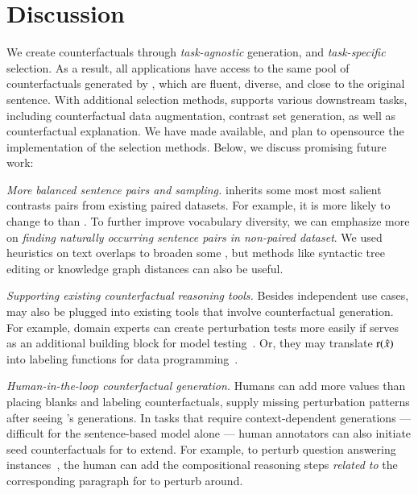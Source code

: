 \section{Discussion}
\label{sec:discuss}

We create counterfactuals through \emph{task-agnostic} generation, and \emph{task-specific} selection.
As a result, all applications have access to the same pool of counterfactuals generated by \sysname, which are fluent, diverse, and close to the original sentence.
With additional selection methods, \sysname supports various downstream tasks, including counterfactual data augmentation, contrast set generation, as well as counterfactual explanation.
We have made \sysname available, and plan to opensource the implementation of the selection methods.
Below, we discuss promising future work:


\emph{More balanced sentence pairs and sampling.}
\sysname inherits some most most salient contrasts pairs from existing paired datasets.
For example, it is more likely to change  to  than .
To further improve vocabulary diversity, we can emphasize more on \emph{finding naturally occurring sentence pairs in non-paired dataset}.
We used heuristics on text overlaps to broaden some \tagstrs, but methods like syntactic tree editing or knowledge graph distances can also be useful.

\emph{Supporting existing counterfactual reasoning tools.}
Besides independent use cases, \sysname may also be plugged into existing tools that involve counterfactual generation.
For example, domain experts can create perturbation tests more easily if \sysname serves as an additional building block for model testing~\cite{checklist:acl20}.
Or, they may translate $\operatorname*{r}(\hat{x})$ into labeling functions for data programming~\cite{ratner2017snorkel}.


\emph{Human-in-the-loop counterfactual generation.}
Humans can add more values than placing blanks and labeling counterfactuals, \eg supply missing perturbation patterns after seeing \sysname's generations.
In tasks that require context-dependent generations --- difficult for the sentence-based model alone --- human annotators can also initiate seed counterfactuals for \sysname to extend.
For example, to perturb question answering instances~\cite{gardner2020contrast}, the human can add the compositional reasoning steps \emph{related to} the corresponding paragraph for \sysname to perturb around.